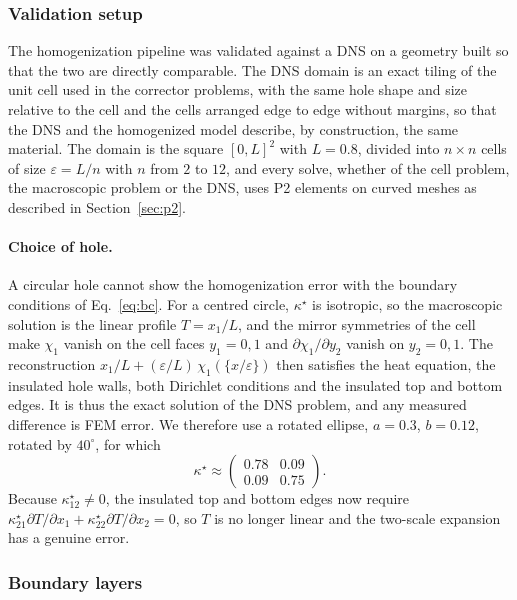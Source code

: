 \documentclass{article}
\makeatletter
\providecommand\FloatBarrier{\par\begingroup\let\@elt\relax
  \edef\@tempa{\@botlist\@deferlist\@dbldeferlist}%
  \ifx\@tempa\@empty\else\clearpage\fi\endgroup}
\makeatother
\begin{document}
\FloatBarrier
\subsubsection{Validation setup}
\label{sec:setup}

The homogenization pipeline was validated against a DNS on a geometry built so that
the two are directly comparable. The DNS domain is an exact tiling of the unit cell used
in the corrector problems, with the same hole shape and size relative to the cell and the
cells arranged edge to edge without margins, so that the DNS and the homogenized model
describe, by construction, the same material. The domain is the square $[0, L]^2$ with
$L = 0.8$, divided into $n \times n$ cells of size $\varepsilon = L / n$ with $n$ from $2$
to $12$, and every solve, whether of the cell problem, the macroscopic problem or the DNS,
uses P2 elements on curved meshes as described in Section~\ref{sec:p2}.

\paragraph{Choice of hole.} A circular hole cannot show the homogenization
error with the boundary conditions of Eq.~\eqref{eq:bc}. For a centred circle,
$\kappa^{\star}$ is isotropic, so the macroscopic solution is the linear profile
$T = x_1 / L$, and the mirror symmetries of the cell make $\chi_1$ vanish on the cell
faces $y_1 = 0, 1$ and $\partial \chi_1 / \partial y_2$ vanish on $y_2 = 0, 1$. The reconstruction
$x_1/L + (\varepsilon / L)\, \chi_1(\{x/\varepsilon\})$ then satisfies the heat
equation, the insulated hole walls, both Dirichlet conditions and the insulated
top and bottom edges. It is thus the exact solution of the DNS problem, and
any measured difference is FEM error. We therefore use a rotated ellipse,
$a = 0.3$, $b = 0.12$, rotated by $40^{\circ}$, for which
\[
\kappa^{\star} \approx \begin{pmatrix} 0.78 & 0.09 \\ 0.09 & 0.75 \end{pmatrix}.
\]
Because $\kappa^{\star}_{12} \neq 0$, the insulated top and bottom edges now
require $\kappa^{\star}_{21} \partial T / \partial x_1 + \kappa^{\star}_{22} \partial T / \partial x_2 = 0$, so $T$
is no longer linear and the two-scale expansion has a genuine error.

\FloatBarrier
\subsubsection{Boundary layers}
\label{sec:boundary_layer}
\end{document}
